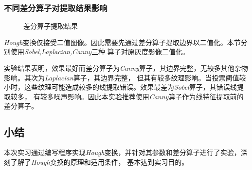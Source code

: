     \subsubsection{不同差分算子对提取结果影响}
    \begin{figure}[H]
        \centering
        \caption{差分算子提取结果}
        \label{hough_delta}
    \end{figure}
    \textit{Hough}变换仅接受二值图像。因此需要先通过差分算子提取边界以二值化。本节分别使用\textit{Sobel,Laplacian,Canny}三种
    算子对原灰度影像二值化。

    实验结果表明，效果最好而差分算子为\textit{Canny}算子，其边界完整，无较多其他杂物影响。其次为\textit{Laplacian}算子，其边界完整，
    但其有较多纹理影响。当投票阈值较小时，这些纹理可能造成较多的线提取错误。效果最差为\textit{Sobel}算子，其错误线提取较多，
    有较多噪声影响。因此本实验推荐使用\textit{Canny}算子作为线特征提取前的差分算子。

\subsection{小结}
    本次实习通过编写程序实现\textit{Hough}变换，并针对其参数和差分算子进行了实验，深刻了解了\textit{Hough}变换的原理和适用条件，
    基本达到实习目的。